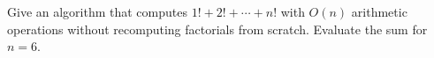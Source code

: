 Give an algorithm that computes $1!+2!+\cdots+n!$ with $O(n)$ arithmetic operations without recomputing factorials from scratch. Evaluate the sum for $n=6$.
